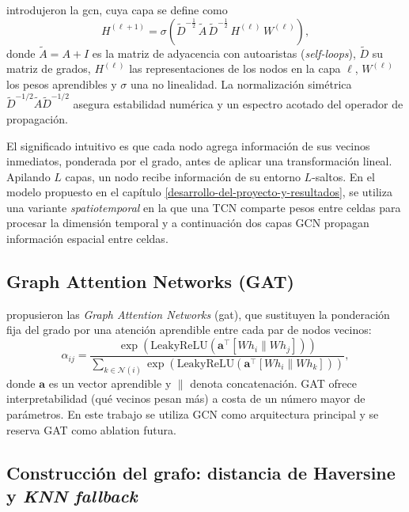 \citet{kipf2017gcn} introdujeron la \gls{gcn}, cuya capa se define como
\begin{equation}
  H^{(\ell+1)} = \sigma\!\left(\tilde{D}^{-\frac{1}{2}}\, \tilde{A}\, \tilde{D}^{-\frac{1}{2}}\, H^{(\ell)}\, W^{(\ell)}\right),
  \label{eq:gcn}
\end{equation}
donde $\tilde{A} = A + I$ es la matriz de adyacencia con autoaristas (\textit{self-loops}), $\tilde{D}$ su matriz de grados, $H^{(\ell)}$ las representaciones de los nodos en la capa $\ell$, $W^{(\ell)}$ los pesos aprendibles y $\sigma$ una no linealidad. La normalización simétrica $\tilde{D}^{-1/2}\tilde{A}\tilde{D}^{-1/2}$ asegura estabilidad numérica y un espectro acotado del operador de propagación.

El significado intuitivo es que cada nodo agrega información de sus vecinos inmediatos, ponderada por el grado, antes de aplicar una transformación lineal. Apilando $L$ capas, un nodo recibe información de su entorno $L$-saltos. En el modelo propuesto en el capítulo \ref{desarrollo-del-proyecto-y-resultados}, se utiliza una variante \emph{spatiotemporal} en la que una TCN comparte pesos entre celdas para procesar la dimensión temporal y a continuación dos capas GCN propagan información espacial entre celdas.

\subsection{Graph Attention Networks (GAT)}
\label{gat-marco}

\citet{velickovic2018gat} propusieron las \emph{Graph Attention Networks} (\gls{gat}), que sustituyen la ponderación fija del grado por una atención aprendible entre cada par de nodos vecinos:
\begin{equation}
  \alpha_{ij} = \frac{\exp\!\left(\mathrm{LeakyReLU}(\mathbf{a}^\top [W h_i \| W h_j])\right)}{\sum_{k \in \mathcal{N}(i)} \exp\!\left(\mathrm{LeakyReLU}(\mathbf{a}^\top [W h_i \| W h_k])\right)},
\end{equation}
donde $\mathbf{a}$ es un vector aprendible y $\|$ denota concatenación. GAT ofrece interpretabilidad (qué vecinos pesan más) a costa de un número mayor de parámetros. En este trabajo se utiliza GCN como arquitectura principal y se reserva GAT como ablation futura.

\subsection{Construcción del grafo: distancia de Haversine y \textit{KNN fallback}}

